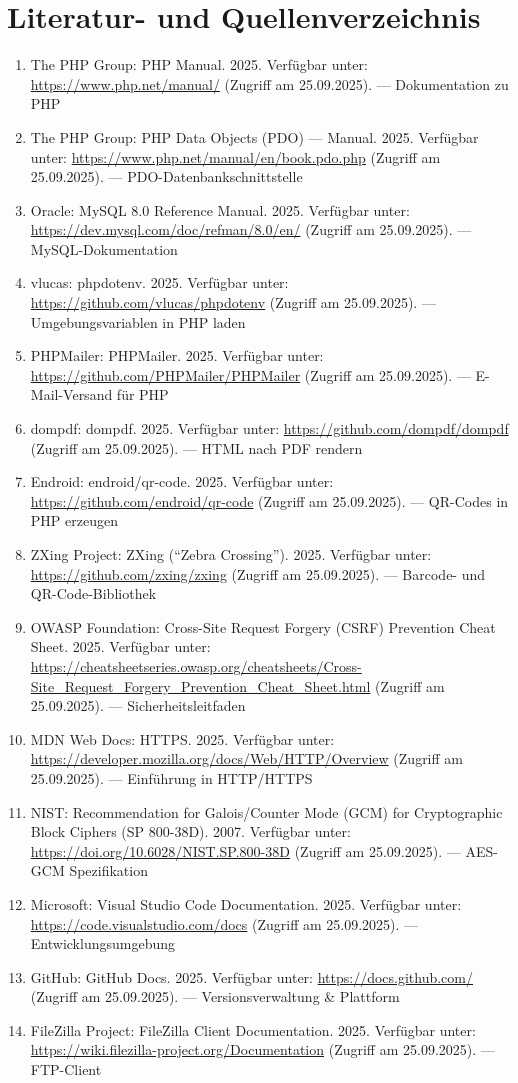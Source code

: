 \section*{Literatur- und Quellenverzeichnis}
\begin{enumerate}
  \item The PHP Group: PHP Manual. 2025. Verfügbar unter: \url{https://www.php.net/manual/} (Zugriff am 25.09.2025). — Dokumentation zu PHP
  \item The PHP Group: PHP Data Objects (PDO) — Manual. 2025. Verfügbar unter: \url{https://www.php.net/manual/en/book.pdo.php} (Zugriff am 25.09.2025). — PDO-Datenbankschnittstelle
  \item Oracle: MySQL 8.0 Reference Manual. 2025. Verfügbar unter: \url{https://dev.mysql.com/doc/refman/8.0/en/} (Zugriff am 25.09.2025). — MySQL-Dokumentation
  \item vlucas: phpdotenv. 2025. Verfügbar unter: \url{https://github.com/vlucas/phpdotenv} (Zugriff am 25.09.2025). — Umgebungsvariablen in PHP laden
  \item PHPMailer: PHPMailer. 2025. Verfügbar unter: \url{https://github.com/PHPMailer/PHPMailer} (Zugriff am 25.09.2025). — E-Mail-Versand für PHP
  \item dompdf: dompdf. 2025. Verfügbar unter: \url{https://github.com/dompdf/dompdf} (Zugriff am 25.09.2025). — HTML nach PDF rendern
  \item Endroid: endroid/qr-code. 2025. Verfügbar unter: \url{https://github.com/endroid/qr-code} (Zugriff am 25.09.2025). — QR-Codes in PHP erzeugen
  \item ZXing Project: ZXing (“Zebra Crossing”). 2025. Verfügbar unter: \url{https://github.com/zxing/zxing} (Zugriff am 25.09.2025). — Barcode- und QR-Code-Bibliothek
  \item OWASP Foundation: Cross-Site Request Forgery (CSRF) Prevention Cheat Sheet. 2025. Verfügbar unter: \url{https://cheatsheetseries.owasp.org/cheatsheets/Cross-Site_Request_Forgery_Prevention_Cheat_Sheet.html} (Zugriff am 25.09.2025). — Sicherheitsleitfaden
  \item MDN Web Docs: HTTPS. 2025. Verfügbar unter: \url{https://developer.mozilla.org/docs/Web/HTTP/Overview} (Zugriff am 25.09.2025). — Einführung in HTTP/HTTPS
  \item NIST: Recommendation for Galois/Counter Mode (GCM) for Cryptographic Block Ciphers (SP 800-38D). 2007. Verfügbar unter: \url{https://doi.org/10.6028/NIST.SP.800-38D} (Zugriff am 25.09.2025). — AES-GCM Spezifikation
  \item Microsoft: Visual Studio Code Documentation. 2025. Verfügbar unter: \url{https://code.visualstudio.com/docs} (Zugriff am 25.09.2025). — Entwicklungsumgebung
  \item GitHub: GitHub Docs. 2025. Verfügbar unter: \url{https://docs.github.com/} (Zugriff am 25.09.2025). — Versionsverwaltung \& Plattform
  \item FileZilla Project: FileZilla Client Documentation. 2025. Verfügbar unter: \url{https://wiki.filezilla-project.org/Documentation} (Zugriff am 25.09.2025). — FTP-Client
\end{enumerate}
